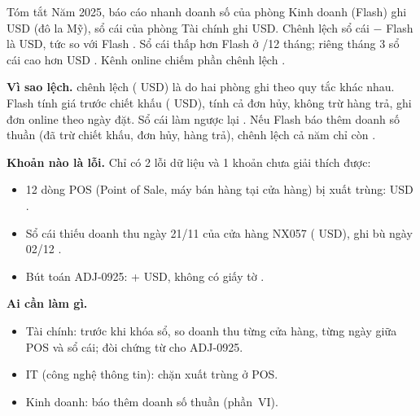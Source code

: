 \begin{infobox}{Tóm tắt}
Năm 2025, báo cáo nhanh doanh số của phòng Kinh doanh (Flash) ghi \SoFlashNam{} USD (đô la Mỹ), sổ cái của phòng Tài chính ghi \SoSoCaiNam{} USD. Chênh lệch sổ cái $-$ Flash là \SoChenhLechNam{} USD, tức \SoPctNam{} so với Flash . Sổ cái thấp hơn Flash ở \SoThangThap{}/12 tháng; riêng tháng 3 sổ cái cao hơn \SoThangBaChenhLech{} USD . Kênh online chiếm \SoOnlineTyTrong{} phần chênh lệch .

\smallskip
\noindent\textbf{Vì sao lệch.} \SoNhomQuyTacPct{} chênh lệch (\SoNhomQuyTac{} USD) là do hai phòng ghi theo quy tắc khác nhau. Flash tính giá trước chiết khấu (\SoChietKhau{} USD), tính cả đơn hủy, không trừ hàng trả, ghi đơn online theo ngày đặt. Sổ cái làm ngược lại . Nếu Flash báo thêm doanh số thuần (đã trừ chiết khấu, đơn hủy, hàng trả), chênh lệch cả năm chỉ còn \SoFlashThuanTraPct{}.

\smallskip
\noindent\textbf{Khoản nào là lỗi.} Chỉ có 2 lỗi dữ liệu và 1 khoản chưa giải thích được:
\begin{itemize}
  \item 12 dòng POS (Point of Sale, máy bán hàng tại cửa hàng) bị xuất trùng: \SoNhomLoi{} USD .
  \item Sổ cái thiếu doanh thu ngày 21/11 của cửa hàng NX057 (\SoNXNamBayLech{} USD), ghi bù ngày 02/12 .
  \item Bút toán ADJ-0925: +\SoNhomChuaGT{} USD, không có giấy tờ .
\end{itemize}

\smallskip
\noindent\textbf{Ai cần làm gì.}
\begin{itemize}
  \item Tài chính: trước khi khóa sổ, so doanh thu từng cửa hàng, từng ngày giữa POS và sổ cái; đòi chứng từ cho ADJ-0925.
  \item IT (công nghệ thông tin): chặn xuất trùng ở POS.
  \item Kinh doanh: báo thêm doanh số thuần (phần~VI).
\end{itemize}

\end{infobox}
